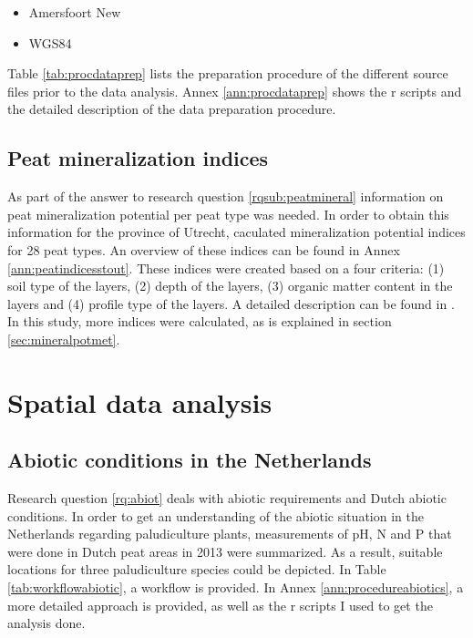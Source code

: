 {%
\begin{itemize}
\item Amersfoort New 
\item WGS84
\end{itemize}

Table \ref{tab:procdataprep} lists the preparation procedure of the different source files prior to the data analysis. Annex \ref{ann:procdataprep} shows the r scripts and the detailed description of the data preparation procedure.


\subsection{Peat mineralization indices}
As part of the answer to research question \ref{rqsub:peatmineral} information on peat mineralization potential per peat type was needed. In order to obtain this information for the province of Utrecht, \citet{stouthamer2008toelichting} caculated mineralization potential indices for 28 peat types. An overview of these indices can be found in Annex \ref{ann:peatindicesstout}. These indices were created based on a four criteria: (1) soil type of the layers, (2) depth of the layers, (3) organic matter content in the layers and (4) profile type of the layers. A detailed description can be found in \citep{stouthamer2008toelichting}. In this study, more indices were calculated, as is explained in section \ref{sec:mineralpotmet}.

\section{Spatial data analysis}

\subsection{Abiotic conditions in the Netherlands}
Research question \ref{rq:abiot} deals with abiotic requirements and Dutch abiotic conditions. 
In order to get an understanding of the abiotic situation in the Netherlands regarding paludiculture plants, measurements of pH, \ac{N} and \ac{P} that were done in Dutch peat areas in 2013 were summarized. As a result, suitable locations for three paludiculture species could be depicted. In Table \ref{tab:workflowabiotic}, a workflow is provided. In Annex \ref{ann:procedureabiotics}, a more detailed approach is provided, as well as the r scripts I used to get the analysis done.

}
